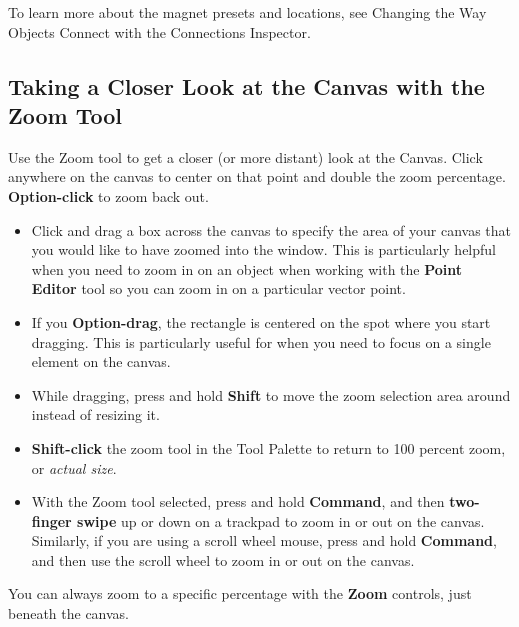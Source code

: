 \documentclass[../main.tex]{subfiles}
\begin{document}

\begin{ognote}
  To learn more about the magnet presets and locations, see Changing the Way Objects Connect with
  the Connections Inspector.
\end{ognote}

\subsection{ Taking a Closer Look at the Canvas with the
Zoom Tool}

Use the Zoom tool to get a closer (or more distant) look at the Canvas. Click anywhere on the
canvas to center on that point and double the zoom percentage. \textbf{Option-click} to zoom
back out.


\begin{itemize}
  \item Click and drag a box across the canvas to specify the area of your canvas that you would
    like to have zoomed into the window. This is particularly helpful when you need to zoom in
    on an object when working with the \textbf{Point Editor} tool so you can zoom in on a
    particular vector point.

  \item If you \textbf{Option-drag}, the rectangle is centered on the spot where you start
    dragging. This is particularly useful for when you need to focus on a single element on the
    canvas.

  \item While dragging, press and hold \textbf{Shift} to move the zoom selection area around
    instead of resizing it.
  \item \textbf{Shift-click} the zoom tool in the Tool Palette to return to 100 percent zoom, or
    \textit{actual size}.
  \item With the Zoom tool selected, press and hold \textbf{Command}, and then
    \textbf{two-finger swipe} up or down on a trackpad to zoom in or out on the canvas.
    Similarly, if you are using a scroll wheel mouse, press and hold \textbf{Command}, and then
    use the scroll wheel to zoom in or out on the canvas.
\end{itemize}

You can always zoom to a specific percentage with the \textbf{Zoom} controls, just beneath the
canvas.
\end{document}
